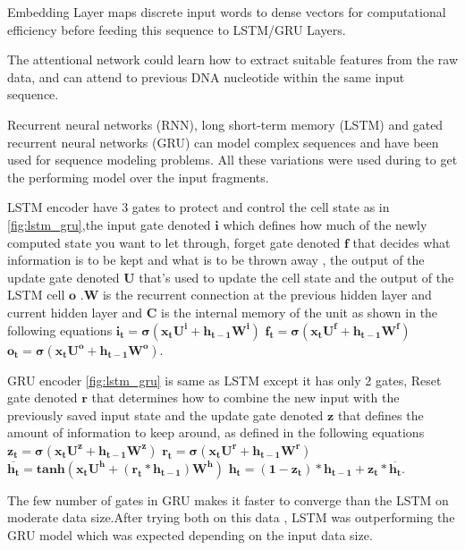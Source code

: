 \documentclass[conference]{IEEEtran}
\begin{document}
Embedding Layer maps discrete input words to dense vectors for computational efficiency before feeding this sequence to LSTM/GRU Layers.


The attentional network could learn how to extract suitable features from the raw data, and can attend to previous DNA nucleotide within the same input sequence. 

Recurrent neural networks (RNN), long short-term memory (LSTM) \cite{hochreiter1997long} and gated recurrent neural networks (GRU) \cite{chung2014empirical} can model complex sequences and have been used for sequence modeling problems. All these variations were used during to get the performing model over the input fragments. 

LSTM encoder have 3 gates to protect and control the cell state as in \ref{fig:lstm_gru},the input gate denoted $\mathbf{i}$ which defines how much of the newly computed state you want to let through, forget gate denoted $\mathbf{f}$ that decides what information is to be kept and what is to be thrown away ,  the output of the update gate denoted $\mathbf{U}$ that's used to update the cell state and the output of the LSTM cell $\mathbf{o}$ .$\mathbf{W}$ is the recurrent connection at the previous hidden layer and current hidden layer and $\mathbf{C}$ is the internal memory of the unit  as shown in the following equations \newline
$\mathbf{i_{t}=\sigma(x_{t}U^i + h_{t-1}W^i)}$ \newline
$\mathbf{f_{t}=\sigma(x_{t}U^f + h_{t-1}W^f)}$ \newline
$\mathbf{o_{t}=\sigma(x_{t}U^o + h_{t-1}W^o)}$. 

GRU encoder \ref{fig:lstm_gru} is same as LSTM except it has only 2 gates, Reset gate denoted $\mathbf{r}$ that determines how to combine the new input with the previously saved input state and the update gate denoted $\mathbf{z}$ that defines the amount of information to keep around, as defined  in the following equations \newline
$\mathbf{z_{t}=\sigma(x_{t}U^z + h_{t-1}W^z)}$ \newline
$\mathbf{r_{t}=\sigma(x_{t}U^r + h_{t-1}W^r)}$ \newline
$\mathbf{\overline{h_{t}} = tanh(x_{t}U^h + (r_{t} * h_{t-1})W^h )}$ \newline
$\mathbf{ h_{t} = (1-z_{t})*h_{t-1} +z_{t}*\overline{h_{t}}}$.

The few number of gates in GRU makes it faster to converge than the LSTM on moderate data size.After trying both on this data , LSTM was outperforming the GRU model which was expected depending on the input data size.
 
\end{document}
